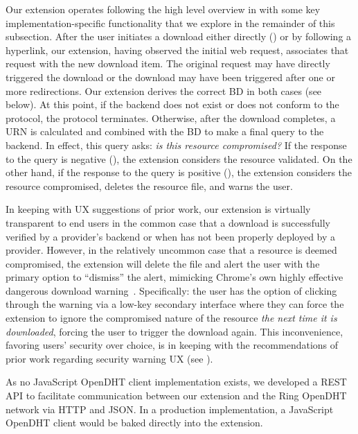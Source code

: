 Our extension operates following the high level overview in 
with some key implementation-specific functionality that we explore in the
remainder of this subsection. After the user initiates a download either
directly () or by following a hyperlink, our
extension, having observed the initial web request, associates that request with
the new download item. The original request may have directly triggered the
download or the download may have been triggered after one or more redirections.
Our extension derives the correct BD in both cases (see below). At this point,
if the backend does not exist or does not conform to the protocol, the protocol
terminates. Otherwise, after the download completes, a URN is calculated and
combined with the BD to make a final query to the backend. In effect, this query
asks: \emph{is this resource compromised?} If the response to the query is
negative (), the extension considers the
resource validated. On the other hand, if the response to the query is positive
(), the extension considers the
resource compromised, deletes the resource file, and warns the user.

In keeping with UX suggestions of prior work, our extension is virtually
transparent to end users in the common case that a download is successfully
verified by a provider's backend or when \SYSTEM{} has not been properly
deployed by a provider. However, in the relatively uncommon case that a resource
is deemed compromised, the extension will delete the file and alert the user
with the primary option to ``dismiss'' the alert, mimicking Chrome's own highly
effective dangerous download warning~\cite{ChromeClickThrough}. Specifically:
the user has the option of clicking through the warning via a low-key secondary
interface where they can force the extension to ignore the compromised nature of
the resource \emph{the next time it is downloaded}, forcing the user to trigger
the download again. This inconvenience, favoring users' security over choice, is
in keeping with the recommendations of prior work regarding security warning UX
(see ).

As no JavaScript OpenDHT client implementation exists, we developed a REST API
to facilitate communication between our extension and the Ring OpenDHT network
via HTTP and JSON. In a production implementation, a JavaScript OpenDHT client
would be baked directly into the extension.


